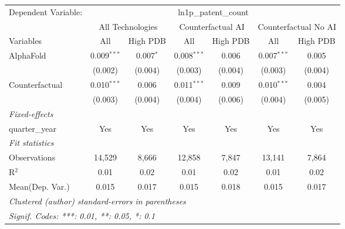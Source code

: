 \begingroup
\centering
\begin{tabular}{lcccccc}
   \tabularnewline \midrule \midrule
   Dependent Variable: & \multicolumn{6}{c}{ln1p\_patent\_count}\\
 & \multicolumn{2}{c}{All Technologies} & \multicolumn{2}{c}{Counterfactual AI} & \multicolumn{2}{c}{Counterfactual No AI} \\
\cmidrule(lr){1-1}\cmidrule(lr){2-3} \cmidrule(lr){4-5} \cmidrule(lr){6-7}
Variables & \multicolumn{1}{c}{All} & \multicolumn{1}{c}{High PDB} & \multicolumn{1}{c}{All} & \multicolumn{1}{c}{High PDB} & \multicolumn{1}{c}{All} & \multicolumn{1}{c}{High PDB} \\
\cmidrule(lr){1-1}\cmidrule(lr){2-2} \cmidrule(lr){3-3} \cmidrule(lr){4-4} \cmidrule(lr){5-5} \cmidrule(lr){6-6} \cmidrule(lr){7-7}
   AlphaFold      & 0.009$^{***}$ & 0.007$^{*}$ & 0.008$^{***}$ & 0.006   & 0.007$^{***}$ & 0.005\\   
                  & (0.002)       & (0.004)     & (0.003)       & (0.004) & (0.003)       & (0.004)\\   
   Counterfactual & 0.010$^{***}$ & 0.006       & 0.011$^{***}$ & 0.009   & 0.010$^{***}$ & 0.004\\   
                  & (0.003)       & (0.004)     & (0.004)       & (0.006) & (0.004)       & (0.005)\\   
   \midrule
   \emph{Fixed-effects}\\
   quarter\_year  & Yes           & Yes         & Yes           & Yes     & Yes           & Yes\\  
   \midrule
   \emph{Fit statistics}\\
   Observations   & 14,529        & 8,666       & 12,858        & 7,847   & 13,141        & 7,864\\  
   R$^2$          & 0.01          & 0.02        & 0.01          & 0.02    & 0.01          & 0.02\\  
Mean(Dep. Var.) & 0.015 & 0.017 & 0.015 & 0.018 & 0.015 & 0.017 \\
   \midrule \midrule
   \multicolumn{7}{l}{\emph{Clustered (author) standard-errors in parentheses}}\\
   \multicolumn{7}{l}{\emph{Signif. Codes: ***: 0.01, **: 0.05, *: 0.1}}\\
\end{tabular}
\par\endgroup
